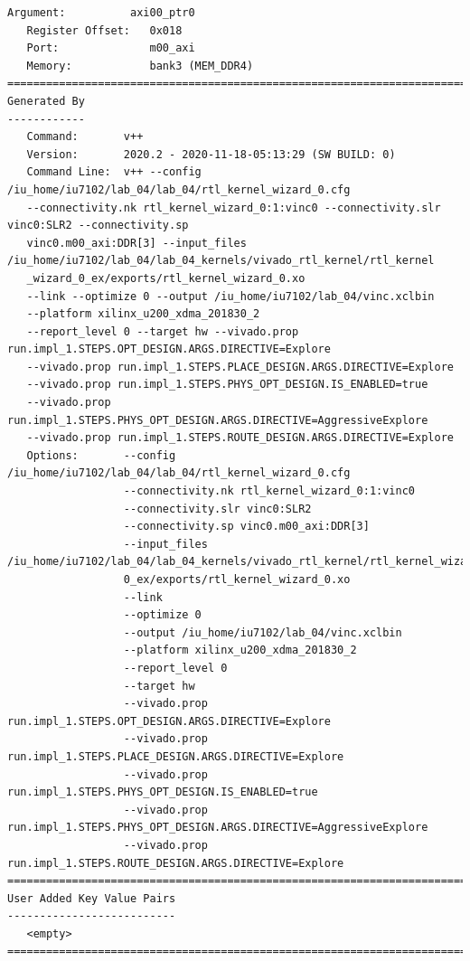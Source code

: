 \begin{lstlisting}[label=code, basicstyle=\tiny, caption=Листинг файла vinc.xclbin.info]
   Argument:          axi00_ptr0
   Register Offset:   0x018
   Port:              m00_axi
   Memory:            bank3 (MEM_DDR4)
==============================================================================
Generated By
------------
   Command:       v++
   Version:       2020.2 - 2020-11-18-05:13:29 (SW BUILD: 0)
   Command Line:  v++ --config /iu_home/iu7102/lab_04/lab_04/rtl_kernel_wizard_0.cfg 
   --connectivity.nk rtl_kernel_wizard_0:1:vinc0 --connectivity.slr vinc0:SLR2 --connectivity.sp 
   vinc0.m00_axi:DDR[3] --input_files /iu_home/iu7102/lab_04/lab_04_kernels/vivado_rtl_kernel/rtl_kernel
   _wizard_0_ex/exports/rtl_kernel_wizard_0.xo 
   --link --optimize 0 --output /iu_home/iu7102/lab_04/vinc.xclbin 
   --platform xilinx_u200_xdma_201830_2 
   --report_level 0 --target hw --vivado.prop run.impl_1.STEPS.OPT_DESIGN.ARGS.DIRECTIVE=Explore 
   --vivado.prop run.impl_1.STEPS.PLACE_DESIGN.ARGS.DIRECTIVE=Explore
   --vivado.prop run.impl_1.STEPS.PHYS_OPT_DESIGN.IS_ENABLED=true 
   --vivado.prop run.impl_1.STEPS.PHYS_OPT_DESIGN.ARGS.DIRECTIVE=AggressiveExplore 
   --vivado.prop run.impl_1.STEPS.ROUTE_DESIGN.ARGS.DIRECTIVE=Explore 
   Options:       --config /iu_home/iu7102/lab_04/lab_04/rtl_kernel_wizard_0.cfg
                  --connectivity.nk rtl_kernel_wizard_0:1:vinc0
                  --connectivity.slr vinc0:SLR2
                  --connectivity.sp vinc0.m00_axi:DDR[3]
                  --input_files /iu_home/iu7102/lab_04/lab_04_kernels/vivado_rtl_kernel/rtl_kernel_wizard_
                  0_ex/exports/rtl_kernel_wizard_0.xo
                  --link
                  --optimize 0
                  --output /iu_home/iu7102/lab_04/vinc.xclbin
                  --platform xilinx_u200_xdma_201830_2
                  --report_level 0
                  --target hw
                  --vivado.prop run.impl_1.STEPS.OPT_DESIGN.ARGS.DIRECTIVE=Explore
                  --vivado.prop run.impl_1.STEPS.PLACE_DESIGN.ARGS.DIRECTIVE=Explore
                  --vivado.prop run.impl_1.STEPS.PHYS_OPT_DESIGN.IS_ENABLED=true
                  --vivado.prop run.impl_1.STEPS.PHYS_OPT_DESIGN.ARGS.DIRECTIVE=AggressiveExplore
                  --vivado.prop run.impl_1.STEPS.ROUTE_DESIGN.ARGS.DIRECTIVE=Explore 
==============================================================================
User Added Key Value Pairs
--------------------------
   <empty>
==============================================================================
\end{lstlisting}

